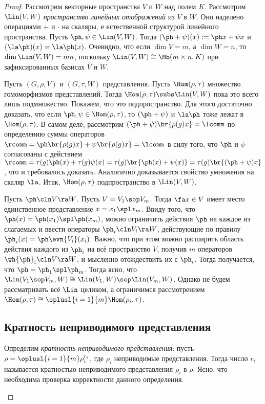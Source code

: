 \documentclass[a4paper]{article}
\begin{document}
\begin{proof}
Рассмотрим векторные пространства $V$ и $W$ над полем $K$. Рассмотрим
$\Lin(V, W)$ \emph{пространство линейных отображений} из $V$
в $W$. Оно наделено операциями $+$ и $\cdot$ на скаляры, е
естественной структурой линейного пространства. Пусть $\ph, \psi
\in \Lin(V,W)$. Тогда $(\ph + \psi)(x):=\ph x+\psi x$ и
$(\la\ph)(x)=\la\ph(x)$. Очевидно, что если $\dim V = m$, а $\dim
W=n$, то $\dim \Lin(V,W) = mn$, поскольку $\Lin(V,W) \cong
\Mb(m\times n, K)$ при зафиксированных базисах $V$ и $W$.

Пусть $(G, \rho, V)$ и $(G, \tau, W)$ представления. Пусть
$\Hom(\rho,\tau)$ множество гомоморфизмов представлений. Тогда
$\Hom(\rho, \tau) \subs \Lin(V,W)$ пока это всего лишь
подмножество. Покажем, что это подпространство. Для этого
достаточно доказать, что если $\ph, \psi \in \Hom(\rho, \tau)$, то
$(\ph + \psi)$ и $\la \ph$ тоже лежат в $\Hom(\rho,\tau)$. В самом
деле, рассмотрим $(\ph + \psi)\br{\rho(g)x}=\lcomm$ по определению
суммы операторов $\rcomm =\ph\br{\rho(g)x} +
\psi\br{\rho(g)x}=\lcomm$ в силу того, что $\ph$ и $\psi$
согласованы с действием $\rcomm = \tau(g)\ph(x) + \tau(g)\psi(x) =
\tau(g)\br{\ph(x)+\psi(x)}=\tau(g)\br{(\ph+\psi)x}$, что и
требовалось доказать. Аналогично доказывается свойство умножения
на скаляр $\la$. Итак, $\Hom(\rho,\tau)$ подпространство в
$\Lin(V, W)$.

Пусть $\ph\cln V \ra W$. Пусть $V = V_1 \sop V_m$. Тогда $\fa x \in V$
имеет место единственное представление $x = x_1 \spl x_m$. Ввиду
того, что $\ph(x) = \ph(x_1) \spl \ph(x_m)$, можно ограничить
действия $\ph$ на каждое из слагаемых и ввести операторы $\ph_i\cln
V_i \ra W$, действующие по правилу $\ph_i(x) =
\ph\evn{V_i}(x_i)$. Важно, что при этом можно расширить область
действия каждого из $\ph_i$ на всё пространство $V$, получив $m$
операторов $\wh{\ph}_i\cln V\ra W$, и мысленно отождествить их с
$\ph_i$. Тогда получается, что $\ph = \ph_1 \spl \ph_m$. Тогда
ясно, что $\Lin(V_1 \sop V_m, W) \cong \Lin(V_1,W) \sop
\Lin(V_m,W)$. Однако не будем рассматривать всё $\Lin$ целиком, а
ограничимся рассмотрением
$\Hom(\rho,\tau)\cong\oplusl{i=1}{m}\Hom(\rho_i,\tau)$.

\subsection{Кратность неприводимого представления}

\begin{df}
Определим \emph{кратность неприводимого представления}: пусть $\rho
=\oplusl{i=1}{m}\rho_i^{r_i}$, где
$\rho_i$ неприводимые представления. Тогда число $r_i$ называется кратностью неприводимого представления
$\rho_i$ в $\rho$. Ясно, что необходима проверка корректности данного определения.
\end{df}


\end{proof}
\end{document}
